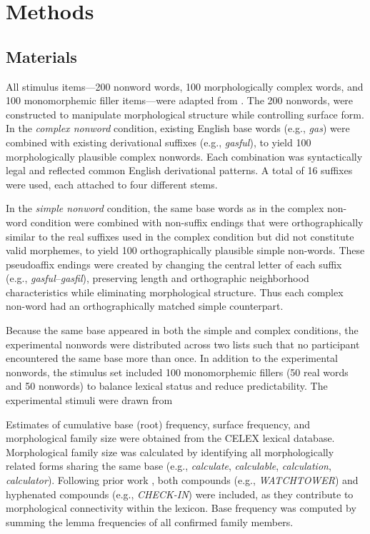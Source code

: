 \documentclass[utf8]{FrontiersinHarvard} %
\begin{document}
	\section{Methods}
	
	\subsection{Materials}
	
	All stimulus items---200 nonword words, 100 morphologically complex words, and 100 monomorphemic filler items---were adapted from \citet{sawiIndividualDifferencesSensitivity2016}. The 200 nonwords, were constructed to manipulate morphological structure while controlling surface form. In the \textit{complex nonword} condition, existing English base words (e.g., \textit{gas}) were combined with existing derivational suffixes (e.g., \textit{gasful}), to yield 100 morphologically plausible complex nonwords. Each combination was syntactically legal and reflected common English derivational patterns. A total of 16 suffixes were used, each attached to four different stems.
	
	In the \textit{simple nonword} condition, the same base words as in the complex non-word condition were combined with non-suffix endings that were orthographically similar to the real suffixes used in the complex condition but did not constitute valid morphemes, to yield 100 orthographically plausible simple non-words. These pseudoaffix endings were created by changing the central letter of each suffix (e.g., \textit{gasful}–\textit{gasfil}), preserving length and orthographic neighborhood characteristics while eliminating morphological structure. Thus each complex non-word had an orthographically matched simple counterpart.
	
	Because the same base appeared in both the simple and complex conditions, the experimental nonwords were distributed across two lists such that no participant encountered the same base more than once. In addition to the experimental nonwords, the stimulus set included 100 monomorphemic fillers (50 real words and 50 nonwords) to balance lexical status and reduce predictability. The experimental stimuli were drawn from \citet{sawiIndividualDifferencesSensitivity2016}
	
	Estimates of cumulative base (root) frequency, surface frequency, and morphological family size were obtained from the CELEX lexical database. Morphological family size was calculated by identifying all morphologically related forms sharing the same base (e.g., \textit{calculate}, \textit{calculable}, \textit{calculation}, \textit{calculator}). Following prior work \citep[e.g.,][]{dejongMorphologicalFamilySize2000, dejongProcessingRepresentationDutch2002}, both compounds (e.g., \textit{WATCHTOWER}) and hyphenated compounds (e.g., \textit{CHECK-IN}) were included, as they contribute to morphological connectivity within the lexicon. Base frequency was computed by summing the lemma frequencies of all confirmed family members.
	
\end{document}
